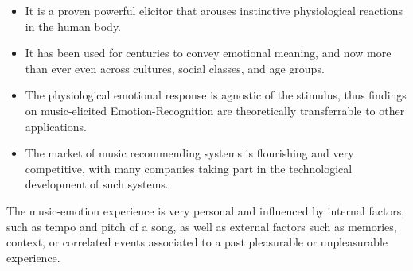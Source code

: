 \begin{itemize}
\item It is a proven powerful elicitor that arouses instinctive physiological reactions in the human body.
\item It has been used for centuries to convey emotional meaning, and now more than ever even across cultures, social classes, and age groups.
\item The physiological emotional response is agnostic of the stimulus, thus findings on music-elicited Emotion-Recognition are theoretically transferrable to other applications.
\item The market of music recommending systems is flourishing and very competitive, with many companies taking part in the technological development of such systems.
\end{itemize}
The music-emotion experience is very personal and influenced by internal factors, such as tempo and pitch of a song, as well as external factors such as memories, context, or correlated events associated to a past pleasurable or unpleasurable experience. 
